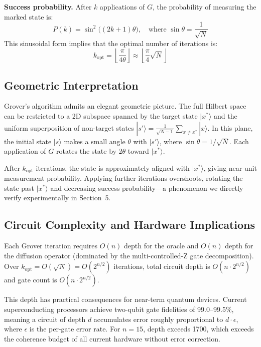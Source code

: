 \documentclass[sigconf, authorversion, nonacm]{acmart}
\begin{document}
\textbf{Success probability.} After $k$ applications of $G$, the probability of measuring the marked state is:
\[
P(k) = \sin^2\!\bigl((2k+1)\theta\bigr), \quad \text{where } \sin\theta = \frac{1}{\sqrt{N}}
\]
This sinusoidal form implies that the optimal number of iterations is:
\[
k_{\text{opt}} = \left\lfloor \frac{\pi}{4\theta} \right\rfloor \approx \left\lfloor \frac{\pi}{4}\sqrt{N} \right\rfloor
\]

\subsection{Geometric Interpretation}

Grover's algorithm admits an elegant geometric picture. The full Hilbert space can be restricted to a 2D subspace spanned by the target state $|x^*\rangle$ and the uniform superposition of non-target states $|s'\rangle = \frac{1}{\sqrt{N-1}}\sum_{x \neq x^*}|x\rangle$. In this plane, the initial state $|s\rangle$ makes a small angle $\theta$ with $|s'\rangle$, where $\sin\theta = 1/\sqrt{N}$. Each application of $G$ rotates the state by $2\theta$ toward $|x^*\rangle$.

After $k_{\text{opt}}$ iterations, the state is approximately aligned with $|x^*\rangle$, giving near-unit measurement probability. Applying further iterations overshoots, rotating the state past $|x^*\rangle$ and decreasing success probability---a phenomenon we directly verify experimentally in Section~5.

\subsection{Circuit Complexity and Hardware Implications}

Each Grover iteration requires $O(n)$ depth for the oracle and $O(n)$ depth for the diffusion operator (dominated by the multi-controlled-Z gate decomposition). Over $k_{\text{opt}} = O(\sqrt{N}) = O(2^{n/2})$ iterations, total circuit depth is $O(n \cdot 2^{n/2})$ and gate count is $O(n \cdot 2^{n/2})$.

This depth has practical consequences for near-term quantum devices. Current superconducting processors achieve two-qubit gate fidelities of 99.0--99.5\%, meaning a circuit of depth $d$ accumulates error roughly proportional to $d \cdot \epsilon$, where $\epsilon$ is the per-gate error rate. For $n=15$, depth exceeds 1700, which exceeds the coherence budget of all current hardware without error correction.
\end{document}
